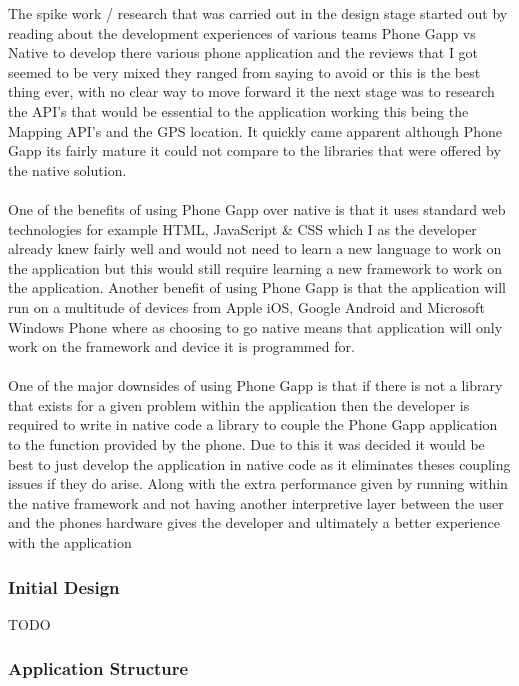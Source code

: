 The spike work / research that was carried out in the design stage started out by reading about the development experiences of various teams Phone Gapp vs Native to develop there various phone application and the reviews that I got seemed to be very mixed they ranged from saying to avoid or this is the best thing ever, with no clear way to move forward it the next stage was to research the API's that would be essential to the application working this being the Mapping API's and the GPS location. It quickly came apparent although Phone Gapp its fairly mature it could not compare to the libraries that were offered by the native solution.\\
\\
One of the benefits of using Phone Gapp over native is that it uses standard web technologies for example HTML, JavaScript \& CSS which I as the developer already knew fairly well and would not need to learn a new language to work on the application but this would still require learning a new framework to work on the application. Another benefit of using Phone Gapp is that the application will run on a multitude of devices from Apple iOS, Google Android and Microsoft Windows Phone where as choosing to go native means that application will only work on the framework and device it is programmed for.\\
\\
One of the major downsides of using Phone Gapp is that if there is not a library that exists for a given problem within the application then the developer is required to write in native code a library to couple the Phone Gapp application to the function provided by the phone. Due to this it was decided it would be best to just develop the application in native code as it eliminates theses coupling issues if they do arise. Along with the extra performance given by running within the native framework and not having another interpretive layer between the user and the phones hardware gives the developer and ultimately a better experience with the application


\subsubsection*{Initial Design}

{TODO}

\subsubsection*{Application Structure}


